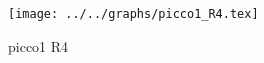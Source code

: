 \begin{figure}[h] \centering\texttt{[image: ../../graphs/picco1\_R4.tex]}\caption{picco1 R4}\label{gr:picco1_R4} \end{figure}
